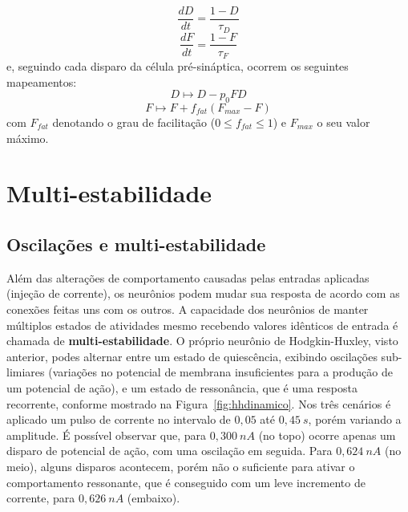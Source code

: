 \begin{equation}\label{eq:depressao_sinaptica}
	\frac{dD}{dt}=\frac{1-D}{\tau_D}
\end{equation}
\begin{equation}\label{eq:facilitacao_sinaptica}
	\frac{dF}{dt}=\frac{1-F}{\tau_F}
\end{equation}
e, seguindo cada disparo da célula pré-sináptica, ocorrem os seguintes mapeamentos:
\begin{equation}\label{eq:mapeamento_depressao_sinaptica}
	D\mapsto D-p_0FD
\end{equation}
\begin{equation}\label{eq:mapeamento_facilitacao_sinaptica}
	F\mapsto F+f_{fat}(F_{max}-F)
\end{equation}
com $F_{fat}$ denotando o grau de facilitação ($0\leq f_{fat}\leq 1$) e $F_{max}$ o seu valor máximo.


\section{Multi-estabilidade}\label{sec:biestabilidade}

\subsection{Oscilações e multi-estabilidade}
Além das alterações de comportamento causadas pelas entradas aplicadas (injeção de corrente), os neurônios podem mudar sua resposta de acordo com as conexões feitas uns com os outros. A capacidade dos neurônios de manter múltiplos estados de atividades mesmo recebendo valores idênticos de entrada é chamada de \textbf{multi-estabilidade}. O próprio neurônio de Hodgkin-Huxley, visto anterior, podes alternar entre um estado de quiescência, exibindo oscilações sub-limiares (variações no potencial de membrana insuficientes para a produção de um potencial de ação), e um estado de ressonância, que é uma resposta recorrente, conforme mostrado na Figura~\ref{fig:hhdinamico}. Nos três cenários é aplicado um pulso de corrente no intervalo de $0,05$ até $0,45\ s$, porém variando a amplitude. É possível observar que, para $0,300\ nA$ (no topo) ocorre apenas um disparo de potencial de ação, com uma oscilação em seguida. Para $0,624\ nA$ (no meio), alguns disparos acontecem, porém não o suficiente para ativar o comportamento ressonante, que é conseguido com um leve incremento de corrente, para $0,626\ nA$ (embaixo).

